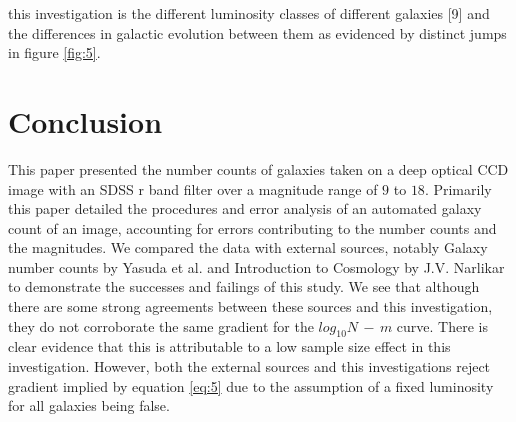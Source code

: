 \documentclass[journal]{IEEEtran}
\begin{document}
this investigation is the different luminosity classes of different galaxies [9] and the differences in galactic evolution between them as evidenced by distinct jumps in figure \ref{fig:5}.

\section{Conclusion}
This paper presented the number counts of galaxies taken on a deep optical CCD image with an SDSS r band filter over a magnitude range of $9$ to $18$. Primarily this paper detailed the procedures and error analysis of an automated galaxy count of an image, accounting for errors contributing to the number counts and the magnitudes. We compared the data with external sources, notably Galaxy number counts by Yasuda et al. and Introduction to Cosmology by J.V. Narlikar to demonstrate the successes and failings of this study. We see that although there are some strong agreements between these sources and this investigation, they do not corroborate the same gradient for the $log_{10}N\,-\,m$ curve. There is clear evidence that this is attributable to a low sample size effect in this investigation. However, both the external sources and this investigations reject gradient implied by equation \ref{eq:5} due to the assumption of a fixed luminosity for all galaxies being false.
\end{document}
